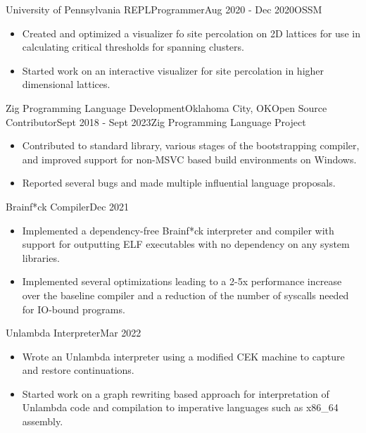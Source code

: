 \documentclass[a4paper]{article}
\begin{document}
    \begin{activity}{University of Pennsylvania REPL}{}{Programmer}{Aug 2020 - Dec 2020}{OSSM}
      \begin{itemize}[topsep=5pt, partopsep=0pt, itemsep=-1pt]
        \item Created and optimized a visualizer fo site percolation on 2D lattices for use in calculating critical thresholds for spanning clusters.
        \item Started work on an interactive visualizer for site percolation in higher dimensional lattices.
      \end{itemize}
    \end{activity}

    \begin{activity}{Zig Programming Language Development}{Oklahoma City, OK}{Open Source Contributor}{Sept 2018 - Sept 2023}{Zig Programming Language Project}
      \begin{itemize}[topsep=5pt, partopsep=0pt, itemsep=-1pt]
        \item Contributed to standard library, various stages of the bootstrapping compiler, and improved support for non-MSVC based build environments on Windows.
        \item Reported several bugs and made multiple influential language proposals.
      \end{itemize}
    \end{activity}

    \begin{activity}{Brainf*ck Compiler}{}{}{Dec 2021}{}
      \begin{itemize}[topsep=5pt, partopsep=0pt, itemsep=-1pt]
        \item Implemented a dependency-free Brainf*ck interpreter and compiler with support for outputting ELF executables with no dependency on any system libraries.
        \item Implemented several optimizations leading to a 2-5x performance increase over the baseline compiler and a reduction of the number of syscalls needed for IO-bound programs.
      \end{itemize}
    \end{activity}

    \begin{activity}{Unlambda Interpreter}{}{}{Mar 2022}{}
      \begin{itemize}[topsep=5pt, partopsep=0pt, itemsep=-1pt]
        \item Wrote an Unlambda interpreter using a modified CEK machine to capture and restore continuations.
        \item Started work on a graph rewriting based approach for interpretation of Unlambda code and compilation to imperative languages such as x86\_64 assembly.
      \end{itemize}
    \end{activity}
\end{document}

